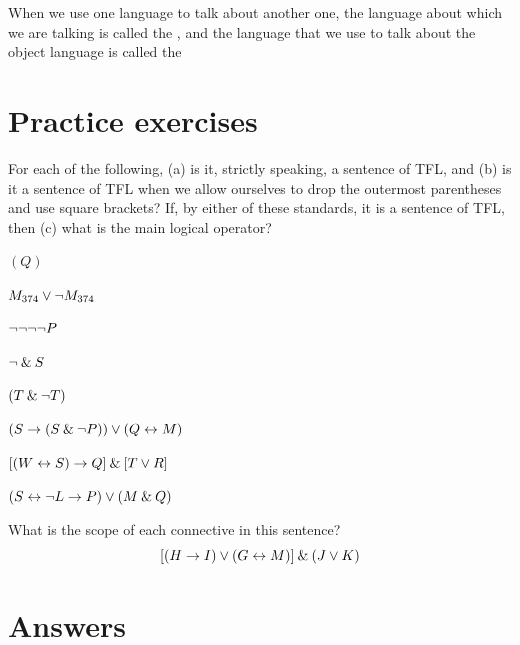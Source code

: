 \begin{notebox}
When we use one language to talk about another one, the language about which we are talking is called the , and the language that we use to talk about the object language is called the 
\end{notebox}



\section{Practice exercises}
\setcounter{ProbPart}{0}

\problempart
\label{pr.wiffTFL}
For each of the following, (a) is it, strictly speaking, a sentence of TFL, and (b) is it a sentence of TFL when we allow ourselves to drop the outermost parentheses and use square brackets? If, by either of these standards, it is a sentence of TFL, then (c) what is the main logical operator?
\begin{earg}
\item $(Q)$
\item $M_{374} \vee {\neg} M_{374}$
\item ${\neg} {\neg} {\neg} {\neg} P$
\item ${\neg} \mathbin{\&} S$
\item $(T \mathbin{\&} {\neg} T)$
\item $(S \rightarrow (S \mathbin{\&} {\neg} P)) \vee (Q \leftrightarrow M)$
\item $[(W \leftrightarrow S) \rightarrow Q] \mathbin{\&} [T \vee R]$
\item $(S \leftrightarrow {\neg} L \rightarrow P) \vee (M \mathbin{\&} Q)$
\end{earg}


\problempart
What is the scope of each connective in this sentence?
$$[(H \rightarrow I) \vee (G \leftrightarrow M)] \mathbin{\&} (J \vee K)$$



\section{Answers}
\setcounter{ProbPart}{0}

